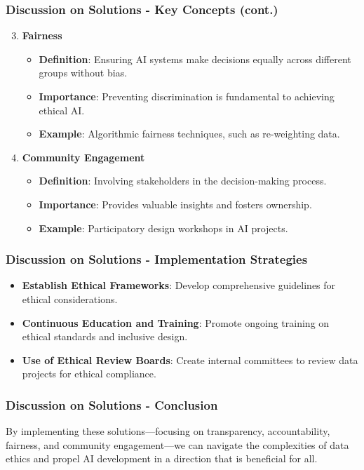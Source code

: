 \documentclass[aspectratio=169]{beamer}
\begin{document}
\begin{frame}[fragile]
    \frametitle{Discussion on Solutions - Key Concepts (cont.)}
    \begin{enumerate}
        \setcounter{enumi}{2}
        \item \textbf{Fairness}
            \begin{itemize}
                \item \textbf{Definition}: Ensuring AI systems make decisions equally across different groups without bias.
                \item \textbf{Importance}: Preventing discrimination is fundamental to achieving ethical AI.
                \item \textbf{Example}: Algorithmic fairness techniques, such as re-weighting data.
            \end{itemize}
        \item \textbf{Community Engagement}
            \begin{itemize}
                \item \textbf{Definition}: Involving stakeholders in the decision-making process.
                \item \textbf{Importance}: Provides valuable insights and fosters ownership.
                \item \textbf{Example}: Participatory design workshops in AI projects.
            \end{itemize}
    \end{enumerate}
\end{frame}

\begin{frame}[fragile]
    \frametitle{Discussion on Solutions - Implementation Strategies}
    \begin{itemize}
        \item \textbf{Establish Ethical Frameworks}: Develop comprehensive guidelines for ethical considerations.
        \item \textbf{Continuous Education and Training}: Promote ongoing training on ethical standards and inclusive design.
        \item \textbf{Use of Ethical Review Boards}: Create internal committees to review data projects for ethical compliance.
    \end{itemize}
\end{frame}

\begin{frame}[fragile]
    \frametitle{Discussion on Solutions - Conclusion}
    By implementing these solutions—focusing on transparency, accountability, fairness, and community engagement—we can navigate the complexities of data ethics and propel AI development in a direction that is beneficial for all.
\end{frame}
\end{document}
